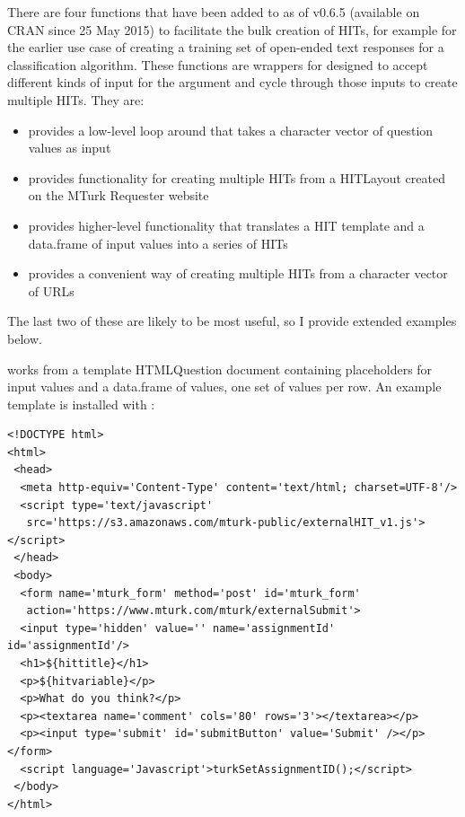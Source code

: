 There are four functions that have been added to  as of v0.6.5 (available on CRAN since 25 May 2015) to facilitate the bulk creation of HITs, for example for the earlier use case of creating a training set of open-ended text responses for a classification algorithm. These functions are wrappers for  designed to accept different kinds of input for the  argument and cycle through those inputs to create multiple HITs. They are: 

\begin{itemize}
\item {} provides a low-level loop around  that takes a character vector of question values as input
\item {} provides functionality for creating multiple HITs from a HITLayout created on the MTurk Requester website
\item {} provides higher-level functionality that translates a HIT template and a data.frame of input values into a series of HITs
\item {} provides a convenient way of creating multiple HITs from a character vector of URLs
\end{itemize}

\noindent The last two of these are likely to be most useful, so I provide extended examples below.

 works from a template HTMLQuestion document containing placeholders for input values and a data.frame of values, one set of values per row. An example template is installed with :

\begin{verbatim}
<!DOCTYPE html>
<html>
 <head>
  <meta http-equiv='Content-Type' content='text/html; charset=UTF-8'/>
  <script type='text/javascript' 
   src='https://s3.amazonaws.com/mturk-public/externalHIT_v1.js'></script>
 </head>
 <body>
  <form name='mturk_form' method='post' id='mturk_form' 
   action='https://www.mturk.com/mturk/externalSubmit'>
  <input type='hidden' value='' name='assignmentId' id='assignmentId'/>
  <h1>${hittitle}</h1>
  <p>${hitvariable}</p>
  <p>What do you think?</p>
  <p><textarea name='comment' cols='80' rows='3'></textarea></p>
  <p><input type='submit' id='submitButton' value='Submit' /></p></form>
  <script language='Javascript'>turkSetAssignmentID();</script>
 </body>
</html>
\end{verbatim}

